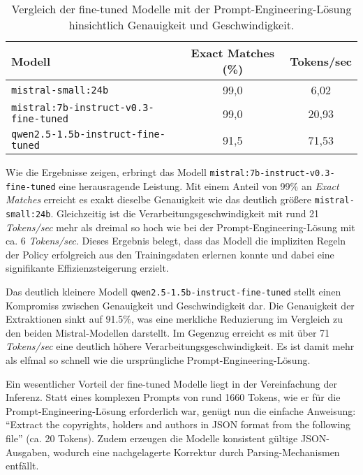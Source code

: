 \begin{table}[H]
    \centering
    \begin{tabular}{l c c}
        \hline
        \textbf{Modell} & \textbf{Exact Matches (\%)} & \textbf{Tokens/sec} \\
        \hline
        \texttt{mistral-small:24b} & 99,0 & 6,02 \\
        \texttt{mistral:7b-instruct-v0.3-fine-tuned} & 99,0 & 20,93 \\
        \texttt{qwen2.5-1.5b-instruct-fine-tuned} & 91,5 & 71,53 \\
        \hline
    \end{tabular}
    \caption{Vergleich der fine-tuned Modelle mit der Prompt-Engineering-Lösung hinsichtlich Genauigkeit und Geschwindigkeit.}
    \label{tab:modellvergleich}
\end{table}

Wie die Ergebnisse zeigen, erbringt das Modell \texttt{mistral:7b-instruct-v0.3-fine-tuned} eine herausragende Leistung.
Mit einem Anteil von \num{99}\% an \textit{Exact Matches} erreicht es exakt dieselbe Genauigkeit wie das deutlich größere \texttt{mistral-small:24b}.
Gleichzeitig ist die Verarbeitungsgeschwindigkeit mit rund \num{21} \textit{Tokens/sec} mehr als dreimal so hoch wie bei der Prompt-Engineering-Lösung mit ca. \num{6} \textit{Tokens/sec}.
Dieses Ergebnis belegt, dass das Modell die impliziten Regeln der Policy erfolgreich aus den Trainingsdaten erlernen konnte und dabei eine signifikante Effizienzsteigerung erzielt.

Das deutlich kleinere Modell \texttt{qwen2.5-1.5b-instruct-fine-tuned} stellt einen Kompromiss zwischen Genauigkeit und Geschwindigkeit dar.
Die Genauigkeit der Extraktionen sinkt auf \num{91,5}\%, was eine merkliche Reduzierung im Vergleich zu den beiden Mistral-Modellen darstellt.
Im Gegenzug erreicht es mit über \num{71} \textit{Tokens/sec} eine deutlich höhere Verarbeitungsgeschwindigkeit.
Es ist damit mehr als elfmal so schnell wie die ursprüngliche Prompt-Engineering-Lösung.

Ein wesentlicher Vorteil der fine-tuned Modelle liegt in der Vereinfachung der Inferenz.
Statt eines komplexen Prompts von rund 1660 Tokens, wie er für die Prompt-Engineering-Lösung erforderlich war, genügt nun die einfache Anweisung: \enquote{Extract the copyrights, holders and authors in JSON format from the following file} (ca. 20 Tokens).
Zudem erzeugen die Modelle konsistent gültige JSON-Ausgaben, wodurch eine nachgelagerte Korrektur durch Parsing-Mechanismen entfällt.

